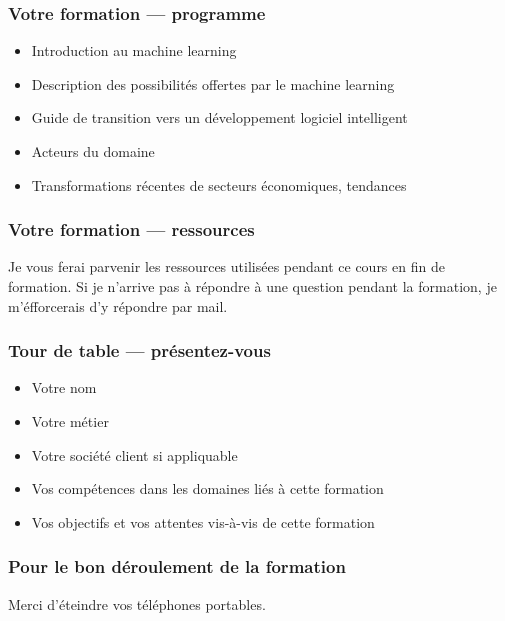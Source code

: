 \begin{frame}
  \frametitle{Votre formation — programme}
  \begin{itemize}
  \item Introduction au machine learning
  \item Description des possibilités offertes par le machine learning 
  \item Guide de transition vers un développement logiciel intelligent
  \item Acteurs du domaine
  \item Transformations récentes de secteurs économiques, tendances
  \end{itemize}
\end{frame}

\begin{frame}
  \frametitle{Votre formation — ressources}
  Je vous ferai parvenir les ressources utilisées pendant ce cours en fin de formation.
  Si je n'arrive pas à répondre à une question pendant la formation, je m'éfforcerais d'y répondre par mail.
\end{frame}

\begin{frame}
  \frametitle{Tour de table — présentez-vous}
  \begin{itemize}
  \item Votre nom
  \item Votre métier
  \item Votre société client si appliquable
  \item Vos compétences dans les domaines liés à cette formation
  \item Vos objectifs et vos attentes vis-à-vis de cette formation
  \end{itemize}
\end{frame}

\begin{frame}
  \frametitle{Pour le bon déroulement de la formation}
  Merci d'éteindre vos téléphones portables.
\end{frame}
